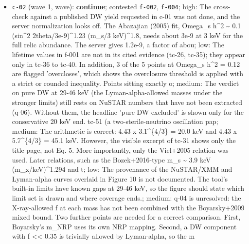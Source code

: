 \documentclass[11pt,a4paper]{article}
\begin{document}
\begin{itemize}
  \item \texttt{c-02} (wave 1, wave): \textbf{continue}; contested \texttt{f-002}, \texttt{f-004}; high: The cross-check against a published DW yield requested in c-01 was not done, and the server normalization looks off. The Abazajian (2005) fit, Omega\_s h\textasciicircum{}2 \textasciitilde{} 0.1 (sin\textasciicircum{}2 2theta/3e-9)\textasciicircum{}1.23 (m\_s/3 keV)\textasciicircum{}1.8, needs about 3e-9 at 3 keV for the full relic abundance. The server gives 1.2e-9, a factor of abou; low: The lifetime values in f-001 are not in its cited evidence (tc-26, tc-35); they appear only in tc-36 to tc-40. In addition, 3 of the 5 points at Omega\_s h\textasciicircum{}2 = 0.12 are flagged 'overcloses', which shows the overclosure threshold is applied with a strict or rounded inequality. Points sitting exactly o; medium: The verdict on pure DW at 29-46 keV (the Lyman-alpha-allowed masses under the stronger limits) still rests on NuSTAR numbers that have not been extracted (q-06). Without them, the headline 'pure DW excluded' is shown only for the conservative 20 keV end. tc-51 (a two-sterile-neutrino oscillation pap; medium: The arithmetic is correct: 4.43 x 3.1\textasciicircum{}\{4/3\} = 20.0 keV and 4.43 x 5.7\textasciicircum{}\{4/3\} = 45.1 keV. However, the visible excerpt of tc-31 shows only the title page, not Eq. 5. More importantly, only the Viel+2005 relation was used. Later relations, such as the Bozek+2016-type m\_s \textasciitilde{} 3.9 keV (m\_x/keV)\textasciicircum{}1.294 and t; low: The provenance of the NuSTAR/XMM and Lyman-alpha curves overlaid in Figure 10 is not documented. The tool's built-in limits have known gaps at 29-46 keV, so the figure should state which limit set is drawn and where coverage ends.; medium: q-04 is unresolved: the X-ray-allowed f at each mass has not been combined with the Boyarsky+2009 mixed bound. Two further points are needed for a correct comparison. First, Boyarsky's m\_NRP uses its own NRP mapping. Second, a DW component with f \textless{}\textless{} 0.35 is trivially allowed by Lyman-alpha, so the m

\end{itemize}
\end{document}
